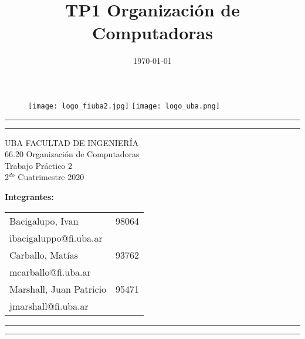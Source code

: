 \documentclass[11pt,a4paper]{article}
\begin{document}
\title{TP1 Organización de Computadoras}
\date{\today}

\begin{titlepage}
	
	\begin{figure}[H]
		\raggedright
		\texttt{[image: logo\_fiuba2.jpg]}
		\hfill
		\raggedleft
		\texttt{[image: logo\_uba.png]}
	\end{figure}
	\rule{\textwidth}{1pt}\par %
	\vspace{2pt}\vspace{-\baselineskip} %
	\rule{\textwidth}{0.4pt}\par %
	
	\vspace{0.05\textheight} %
	\centering %
	{\Huge UBA FACULTAD DE INGENIERÍA}\\[0.5\baselineskip]
	{\Large 66.20 Organización de Computadoras}\\[0.5\baselineskip]
	{\Huge Trabajo Práctico 2}\\[0.75\baselineskip]
	{\Large 2$^{do}$ Cuatrimestre 2020}\\[0.5\baselineskip]
	\vspace{0.2\textheight}


	\begin{flushleft}
	\begin{table}[H]
		\begin{flushleft}
		\textbf{Integrantes:}\\
		\vspace{0.01\textheight}
		\begin{tabular}{l r}
			Bacigalupo, Ivan  & 98064\\
			\hspace{0.05\textheight}ibacigaluppo@fi.uba.ar&\\
			Carballo, Matías   & 93762\\
			\hspace{0.05\textheight}mcarballo@fi.uba.ar&\\
			Marshall, Juan Patricio & 95471\\
			\hspace{0.05\textheight}jmarshall@fi.uba.ar&\\
		\end{tabular}
		\end{flushleft}
	\end{table}
		

	\end{flushleft}
	\vspace{0.05\textheight}
	\vspace{2pt}
	\vfill
	\rule{\textwidth}{1pt}\par %
	\vspace{2pt}\vspace{-\baselineskip} %
	\rule{\textwidth}{0.4pt}\par %
	
\end{titlepage}
\end{document}
